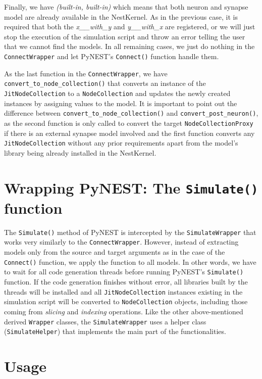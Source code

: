Finally, we have \emph{(built-in, built-in)} which means that both neuron and synapse model are already available in the NestKernel. As in the previous case, it is required that both the \emph{x\_\_with\_y} and \emph{y\_\_with\_x} are registered, or we will just stop the execution of the simulation script and throw an error telling the user that we cannot find the models. In all remaining cases, we just do nothing in the \texttt{ConnectWrapper} and let PyNEST's \texttt{Connect()} function handle them. 

As the last function in the \texttt{ConnectWrapper}, we have \texttt{convert\_to\_node\_collection()} that converts an instance of the \texttt{JitNodeCollection} to a \texttt{NodeCollection} and updates the newly created instances by assigning values to the model. It is important to point out the difference between \texttt{convert\_to\_node\_collection()} and \texttt{convert\_post\_neuron()}, as the second function is only called to convert the target \texttt{NodeCollectionProxy} if there is an external synapse model involved and the first function converts any \texttt{JitNodeCollection} without any prior requirements apart from the model's library being already installed in the NestKernel.

\section{Wrapping PyNEST: The \texttt{Simulate()} function}

The \texttt{Simulate()} method of PyNEST is intercepted by the \texttt{SimulateWrapper} that works very similarly to the \texttt{ConnectWrapper}. However, instead of extracting models only from the source and target arguments as in the case of the \texttt{Connect()} function, we apply the function to all models. In other words, we have to wait for all code generation threads before running PyNEST's \texttt{Simulate()} function. If the code generation finishes without error, all libraries built by the threads will be installed and all \texttt{JitNodeCollection} instances existing in the simulation script will be converted to \texttt{NodeCollection} objects, including those coming from \emph{slicing} and \emph{indexing} operations. Like the other above-mentioned derived \texttt{Wrapper} classes, the \texttt{SimulateWrapper} uses a helper class (\texttt{SimulateHelper}) that implements the main part of the functionalities.

\section{Usage}


